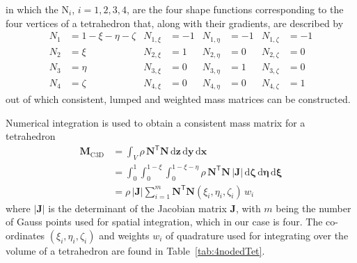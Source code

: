 in which the $\mathrm{N}_i$, $i = 1, 2, 3, 4$, are the four shape functions corresponding to the four vertices of a tetrahedron that, along with their gradients, are described by
\begin{subequations}
    \label{tetShapeFunctions}
    \begin{align}
    N_1 & = 1 - \xi - \eta - \zeta & N_{1,\xi} & = -1 &
    N_{1,\eta} & = -1 & N_{1,\zeta} & = -1 \\
    N_2 & = \xi & N_{2,\xi} & = 1 & N_{2,\eta} & = 0 & N_{2,\zeta} & = 0 \\
    N_3 & = \eta & N_{3,\xi} & = 0 & N_{3,\eta} & = 1 & N_{3,\zeta} & = 0 \\
    N_4 & = \zeta & N_{4,\xi} & = 0 & N_{4,\eta} & = 0 & N_{4,\zeta} & = 1 
    \end{align}
\end{subequations}
out of which consistent, lumped and weighted mass matrices can be constructed.

Numerical integration is used to obtain a consistent mass matrix for a tetrahedron
\begin{equation}
\begin{aligned}
\mathbf{M}_{\mathrm{C3D}} & = \int_V \rho \, \mathbf{N}^{\mathsf{T}} \mathbf{N} \, \mathrm{d} \mathbf{z} \, \mathrm{d} \mathbf{y} \, \mathrm{d} \mathbf{x} \\ & = \int_0^1 \int_0^{1-\xi} \int_0^{1-\xi-\eta} \rho \, \mathbf{N}^{\mathsf{T}} \mathbf{N} \, | \mathbf{J} | \, \mathrm{d} \mathbf{\zeta} \, \mathrm{d} \mathbf{\eta} \, \mathrm{d} \mathbf{\xi} \\ & = \rho \, |\mathbf{J} | \sum_{i=1}^m \mathbf{N}^{\mathsf{T}} \mathbf{N} (\xi_i , \eta_i , \zeta_i ) \, w_i
\end{aligned}
\label{consMass3D}
\end{equation}
where $|\mathbf{J}|$ is the determinant of the Jacobian matrix $\mathbf{J}$, with $m$ being the number of Gauss points used for spatial integration, which in our case is four.  The co-ordinates $( \xi_i , \eta_i , \zeta_i )$ and weights $w_i$ of quadrature used for integrating over the volume of a tetrahedron are found in Table~\ref{tab:4nodedTet}.

